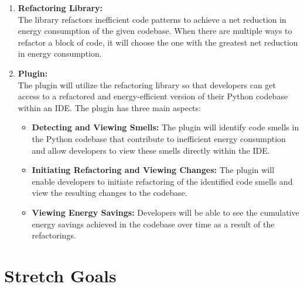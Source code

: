 \documentclass{article}
\begin{document}
\begin{enumerate}
    \item \textbf{Refactoring Library:} \\
    The library refactors inefficient code patterns to achieve a net reduction in energy consumption of the given codebase. When there are multiple ways to refactor a block of code, it will choose the one with the greatest net reduction in energy consumption.

    \item \textbf{Plugin:} \\
    The plugin will utilize the refactoring library so that developers can get access to a refactored and energy-efficient version of their Python codebase within an IDE. The plugin has three main aspects:

    \begin{itemize}
    \item \textbf{Detecting and Viewing Smells:} The plugin will identify code smells in the Python codebase that contribute to inefficient energy consumption and allow developers to view these smells directly within the IDE.
    \item \textbf{Initiating Refactoring and Viewing Changes:} The plugin will enable developers to initiate refactoring of the identified code smells and view the resulting changes to the codebase.
    \item \textbf{Viewing Energy Savings:} Developers will be able to see the cumulative energy savings achieved in the codebase over time as a result of the refactorings.
    \end{itemize}
\end{enumerate}

\section{Stretch Goals}
\end{document}
